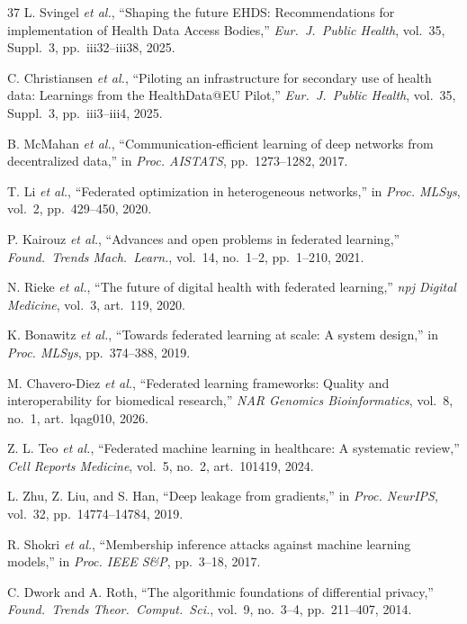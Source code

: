 \documentclass[conference]{IEEEtran}
\begin{document}
\begin{thebibliography}{37}
L. Svingel \textit{et al.}, ``Shaping the future EHDS: Recommendations for implementation of Health Data Access Bodies,'' \textit{Eur.~J.~Public Health}, vol.~35, Suppl.~3, pp.~iii32--iii38, 2025.

C. Christiansen \textit{et al.}, ``Piloting an infrastructure for secondary use of health data: Learnings from the HealthData@EU Pilot,'' \textit{Eur.~J.~Public Health}, vol.~35, Suppl.~3, pp.~iii3--iii4, 2025.

B. McMahan \textit{et al.}, ``Communication-efficient learning of deep networks from decentralized data,'' in \textit{Proc. AISTATS}, pp.~1273--1282, 2017.

T. Li \textit{et al.}, ``Federated optimization in heterogeneous networks,'' in \textit{Proc. MLSys}, vol.~2, pp.~429--450, 2020.

P. Kairouz \textit{et al.}, ``Advances and open problems in federated learning,'' \textit{Found.~Trends Mach.~Learn.}, vol.~14, no.~1--2, pp.~1--210, 2021.

N. Rieke \textit{et al.}, ``The future of digital health with federated learning,'' \textit{npj Digital Medicine}, vol.~3, art.~119, 2020.

K. Bonawitz \textit{et al.}, ``Towards federated learning at scale: A system design,'' in \textit{Proc. MLSys}, pp.~374--388, 2019.

M. Chavero-Diez \textit{et al.}, ``Federated learning frameworks: Quality and interoperability for biomedical research,'' \textit{NAR Genomics Bioinformatics}, vol.~8, no.~1, art.~lqag010, 2026.

Z. L. Teo \textit{et al.}, ``Federated machine learning in healthcare: A systematic review,'' \textit{Cell Reports Medicine}, vol.~5, no.~2, art.~101419, 2024.

L. Zhu, Z. Liu, and S. Han, ``Deep leakage from gradients,'' in \textit{Proc. NeurIPS}, vol.~32, pp.~14774--14784, 2019.

R. Shokri \textit{et al.}, ``Membership inference attacks against machine learning models,'' in \textit{Proc. IEEE S\&P}, pp.~3--18, 2017.

C. Dwork and A. Roth, ``The algorithmic foundations of differential privacy,'' \textit{Found.~Trends Theor.~Comput.~Sci.}, vol.~9, no.~3--4, pp.~211--407, 2014.


\end{thebibliography}
\end{document}
